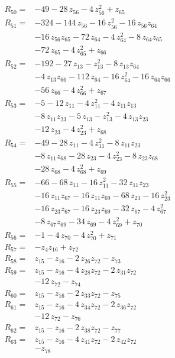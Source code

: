 \begin{align*}
R_{50}={}&-49 -28\,z_{56} -4\,z_{56}^{2} +z_{65}\\[2pt]
R_{51}={}&-324 -144\,z_{56} -16\,z_{56}^{2} -16\,z_{56}z_{64}\\
&-16\,z_{56}z_{65} -72\,z_{64} -4\,z_{64}^{2} -8\,z_{64}z_{65}\\
&-72\,z_{65} -4\,z_{65}^{2} +z_{66}\\[2pt]
R_{52}={}&-192 -27\,z_{13} -z_{13}^{2} -8\,z_{13}z_{64}\\
&-4\,z_{13}z_{66} -112\,z_{64} -16\,z_{64}^{2} -16\,z_{64}z_{66}\\
&-56\,z_{66} -4\,z_{66}^{2} +z_{67}\\[2pt]
R_{53}={}&-5 -12\,z_{11} -4\,z_{11}^{2} -4\,z_{11}z_{13}\\
&-8\,z_{11}z_{23} -5\,z_{13} -z_{13}^{2} -4\,z_{13}z_{23}\\
&-12\,z_{23} -4\,z_{23}^{2} +z_{68}\\[2pt]
R_{54}={}&-49 -28\,z_{11} -4\,z_{11}^{2} -8\,z_{11}z_{23}\\
&-8\,z_{11}z_{68} -28\,z_{23} -4\,z_{23}^{2} -8\,z_{23}z_{68}\\
&-28\,z_{68} -4\,z_{68}^{2} +z_{69}\\[2pt]
R_{55}={}&-66 -68\,z_{11} -16\,z_{11}^{2} -32\,z_{11}z_{23}\\
&-16\,z_{11}z_{67} -16\,z_{11}z_{69} -68\,z_{23} -16\,z_{23}^{2}\\
&-16\,z_{23}z_{67} -16\,z_{23}z_{69} -32\,z_{67} -4\,z_{67}^{2}\\
&-8\,z_{67}z_{69} -34\,z_{69} -4\,z_{69}^{2} +z_{70}\\[2pt]
R_{56}={}&-1 -4\,z_{70} -4\,z_{70}^{2} +z_{71}\\[2pt]
R_{57}={}&-z_{4}z_{16} +z_{72}\\[2pt]
R_{58}={}&z_{15} -z_{16} -2\,z_{26}z_{72} -z_{73}\\[2pt]
R_{59}={}&z_{15} -z_{16} -4\,z_{28}z_{72} -2\,z_{31}z_{72}\\
&-12\,z_{72} -z_{74}\\[2pt]
R_{60}={}&z_{15} -z_{16} -2\,z_{33}z_{72} -z_{75}\\[2pt]
R_{61}={}&z_{15} -z_{16} -4\,z_{34}z_{72} -2\,z_{36}z_{72}\\
&-12\,z_{72} -z_{76}\\[2pt]
R_{62}={}&z_{15} -z_{16} -2\,z_{38}z_{72} -z_{77}\\[2pt]
R_{63}={}&z_{15} -z_{16} -4\,z_{41}z_{72} -2\,z_{42}z_{72}\\
&-z_{78}\\[2pt]

\end{align*}
